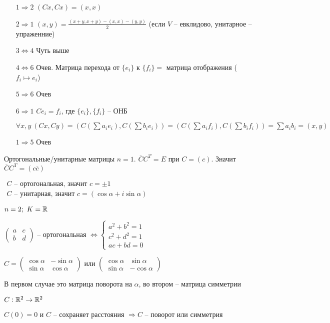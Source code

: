 \documentclass[12pt]{article}
\begin{document}
\begin{itemize}
    \item[$1 \Rightarrow 2$] $(Cx, Cx) = (x, x)$
    \item[$2 \Rightarrow 1$] $(x, y) = \frac{(x + y, x + y) - (x, x) - (y, y)}{2}$ (если $V$ -- евклидово, унитарное -- упраженние)
    \item[$3 \Leftrightarrow 4$] Чуть выше 
    \item[$4 \Leftrightarrow 6$] Очев. Матрица перехода от $\{e_i\}$ к $\{f_i\} =$ матрица отображения ($f_i \mapsto e_i$)
    \item[$5 \Rightarrow 6$] Очев 
    \item[$6 \Rightarrow 1$] $Ce_i = f_i$, где $\{e_i\}, \{f_i\}$ -- ОНБ 
    
    $\forall x, y\ (Cx, Cy) = (C(\sum a_ie_i), C(\sum b_ie_i)) = (C(\sum a_if_i), C(\sum b_if_i)) = \sum a_ib_i = (x, y)$

    \item[$1 \Rightarrow 5$] Очев 
\end{itemize}

\begin{Example}{Ортогональные/унитарные матрицы}
    $n = 1$. $\overline{C}C^T = E$ при $C = (c)$. Значит $\overline{C}C^T = (c \overline{c})$

    $\begin{gathered}
        C \text{ -- ортогональная, значит } c = \pm 1 \\
        C \text{ -- унитарная, значит } c = (\cos\alpha + i\sin\alpha)
    \end{gathered}$

    $n = 2;\ K = \mathbb R$

    $\begin{pmatrix}
        a & c \\
        b & d 
    \end{pmatrix}$ -- ортогональная $\Leftrightarrow \begin{cases}
        a^2 + b^2 = 1 \\
        c^2 + d^2 = 1 \\
        ac + bd = 0
    \end{cases}$

    $C = \begin{pmatrix}
        \cos\alpha & -\sin\alpha \\
        \sin\alpha & \cos\alpha
    \end{pmatrix}$ или $\begin{pmatrix}
        \cos\alpha & \sin\alpha \\
        \sin\alpha & -\cos\alpha
    \end{pmatrix}$

    В первом случае это матрица поворота на $\alpha$, во втором -- матрица симметрии

    $C : \mathbb R^2 \to \mathbb R^2$

    $C(0) = 0$ и $C$ -- сохраняет расстояния $\Rightarrow C$ -- поворот или симметрия
\end{Example}
\end{document}
